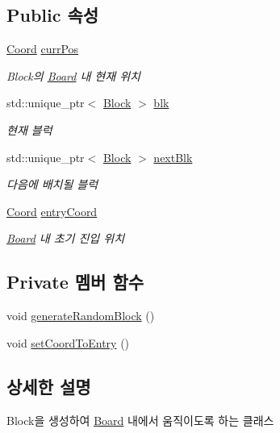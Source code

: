 \subsection*{Public 속성}
\begin{DoxyCompactItemize}
\item 
\mbox{\hyperlink{struct_coord}{Coord}} \mbox{\hyperlink{class_block_handler_a11bd634fdc179446f9c6751e2394999e}{curr\+Pos}}
\begin{DoxyCompactList}\small\item\em Block의 \mbox{\hyperlink{class_board}{Board}} 내 현재 위치 \end{DoxyCompactList}\item 
std\+::unique\+\_\+ptr$<$ \mbox{\hyperlink{class_block}{Block}} $>$ \mbox{\hyperlink{class_block_handler_ab57212ded2552ab5559d278c8538c454}{blk}}
\begin{DoxyCompactList}\small\item\em 현재 블럭 \end{DoxyCompactList}\item 
std\+::unique\+\_\+ptr$<$ \mbox{\hyperlink{class_block}{Block}} $>$ \mbox{\hyperlink{class_block_handler_a7a7f96fa7c0d44f9e0fb5e52ebc9c428}{next\+Blk}}
\begin{DoxyCompactList}\small\item\em 다음에 배치될 블럭 \end{DoxyCompactList}\item 
\mbox{\hyperlink{struct_coord}{Coord}} \mbox{\hyperlink{class_block_handler_a5a2b1799763c46ced8a197775ca13fa7}{entry\+Coord}}
\begin{DoxyCompactList}\small\item\em \mbox{\hyperlink{class_board}{Board}} 내 초기 진입 위치 \end{DoxyCompactList}\end{DoxyCompactItemize}
\subsection*{Private 멤버 함수}
\begin{DoxyCompactItemize}
\item 
void \mbox{\hyperlink{class_block_handler_afaa88871c837a9af8fc407690aadffd6}{generate\+Random\+Block}} ()
\item 
void \mbox{\hyperlink{class_block_handler_aa0143a5722a52a91357c184354d484a6}{set\+Coord\+To\+Entry}} ()
\end{DoxyCompactItemize}


\subsection{상세한 설명}
Block을 생성하여 \mbox{\hyperlink{class_board}{Board}} 내에서 움직이도록 하는 클래스 

